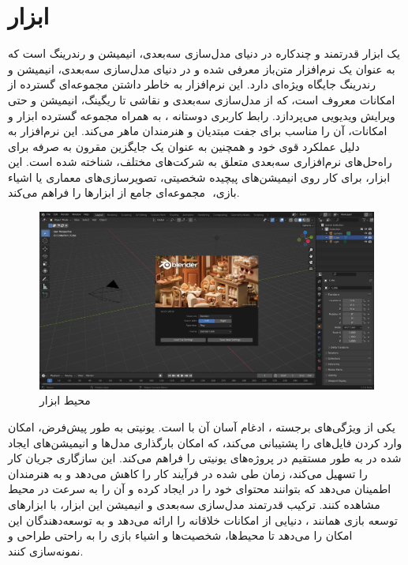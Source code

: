 \section{ابزار }
 یک ابزار قدرتمند و چندکاره در دنیای مدل‌سازی سه‌بعدی، انیمیشن و رندرینگ است که به عنوان یک نرم‌افزار متن‌باز معرفی شده و در دنیای مدل‌سازی سه‌بعدی، انیمیشن و رندرینگ جایگاه ویژه‌ای دارد. این نرم‌افزار به خاطر داشتن مجموعه‌ای گسترده از امکانات معروف است، که از مدل‌سازی سه‌بعدی و نقاشی تا ریگینگ، انیمیشن و حتی ویرایش ویدیویی می‌پردازد. رابط کاربری دوستانه ، به همراه مجموعه گسترده ابزار و امکانات، آن را مناسب برای جفت مبتدیان و هنرمندان ماهر می‌کند. این نرم‌افزار به دلیل عملکرد قوی خود و همچنین به عنوان یک جایگزین مقرون به صرفه برای راه‌حل‌های نرم‌افزاری سه‌بعدی متعلق به شرکت‌های مختلف، شناخته شده است. این ابزار، برای کار روی انیمیشن‌های پیچیده شخصیتی، تصویرسازی‌های معماری یا اشیاء بازی، ‌ مجموعه‌ای جامع از ابزارها را فراهم می‌کند.

\begin{figure}[h!]
    \centering
    \includegraphics[width=1\linewidth]{figures/Blender.png}
    \caption{محیط ابزار }
    \label{fig:Blender}
\end{figure}

یکی از ویژگی‌های برجسته ، ادغام آسان آن با  است. یونیتی به طور پیش‌فرض، امکان وارد کردن فایل‌های  را پشتیبانی می‌کند، که امکان بارگذاری مدل‌ها و انیمیشن‌های ایجاد شده در  به طور مستقیم در پروژه‌های یونیتی را فراهم می‌کند. این سازگاری جریان کار را تسهیل می‌کند، زمان طی شده در فرآیند کار را کاهش می‌دهد و به هنرمندان اطمینان می‌دهد که بتوانند محتوای خود را در  ایجاد کرده و آن را به سرعت در محیط  مشاهده کنند. ترکیب قدرتمند مدل‌سازی سه‌بعدی و انیمیشن این ابزار، با ابزارهای توسعه بازی همانند ، دنیایی از امکانات خلاقانه را ارائه می‌دهد و به توسعه‌دهندگان این امکان را می‌دهد تا محیط‌ها، شخصیت‌ها و اشیاء بازی را به راحتی طراحی و نمونه‌سازی کنند.

